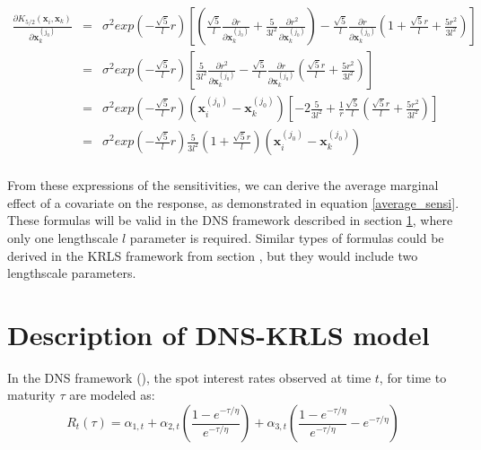 \begin{itemize}
\begin{eqnarray*}
\frac{\partial K_{5/2}(\textbf{x}_i, \textbf{x}_k)}{\partial \textbf{x}_k^{(j_0)}} &=& \sigma^2 exp\left(-\frac{\sqrt{5}}{l}r\right) \left[ \left( \frac{\sqrt{5}}{l} \frac{\partial r}{\partial \textbf{x}_k^{(j_0)}} + \frac{5}{3 l^2} \frac{\partial r^2}{\partial \textbf{x}_k^{(j_0)}} \right)  - \frac{\sqrt{5}}{l} \frac{\partial r}{\partial \textbf{x}_k^{(j_0)}}\left( 1 + \frac{\sqrt{5}r}{l} + \frac{5 r^2}{3 l^2} \right)\right] \\
&=& \sigma^2 exp\left(-\frac{\sqrt{5}}{l}r\right) \left[ \frac{5}{3 l^2} \frac{\partial r^2}{\partial \textbf{x}_k^{(j_0)}}  - \frac{\sqrt{5}}{l} \frac{\partial r}{\partial \textbf{x}_k^{(j_0)}}\left(\frac{\sqrt{5}r}{l} + \frac{5 r^2}{3 l^2} \right)\right] \\
&=& \sigma^2 exp\left(-\frac{\sqrt{5}}{l}r\right) \left(\textbf{x}_i^{(j_0)} - \textbf{x}_k^{(j_0)} \right) \left[ -2\frac{5}{3 l^2} + \frac{1}{r}\frac{\sqrt{5}}{l} \left(\frac{\sqrt{5}r}{l} + \frac{5 r^2}{3 l^2} \right)\right] \\
&=& \sigma^2 exp\left(-\frac{\sqrt{5}}{l}r\right) \frac{5}{3l^2} \left( 1 + \frac{\sqrt{5} r}{l} \right)\left(\textbf{x}_i^{(j_0)} - \textbf{x}_k^{(j_0)} \right)\\
\end{eqnarray*}

\end{itemize}

From these expressions of the sensitivities, we can derive the average  marginal effect of a covariate on the response, as demonstrated in equation \ref{average_sensi}. These formulas will be valid in the DNS framework described in section \ref{sec:dnskrls}, where only one lengthscale $l$ parameter is required. Similar types of formulas could be derived in the KRLS framework from section \label{sec:krls}, but they would include two lengthscale parameters. 

\section{Description of DNS-KRLS model}
\label{sec:dnskrls}

In the DNS framework (\cite{diebold2006forecasting}), the spot interest rates observed at time $t$, for time to maturity $\tau$ are modeled as:
\begin{equation}
R_t(\tau) = \alpha_{1, t} + \alpha_{2, t}\left(\frac{1-e^{-\tau/\eta}}{e^{-\tau/\eta}}\right) + \alpha_{3, t}\left(\frac{1-e^{-\tau/\eta}}{e^{-\tau/\eta}} - e^{-\tau/\eta}\right)
\end{equation}

